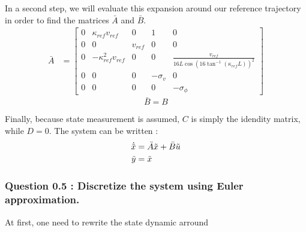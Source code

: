 In a second step, we will evaluate this expansion around our reference trajectory in order to find the matrices $\bar{A}$ and $\bar{B}$.\\
\begin{align}
    \bar{A} &= 
    \left[ {\begin{array}{ccccc}
        0 &\kappa_{ref} v_{ref} &0 &1 &0 \\
        0 &0 &v_{ref} &0 &0\\
        0 &-\kappa_{ref}^2 v_{ref} &0 &0 &\frac{v_{ref}}{16L \cos(16 \tan^{-1}(\kappa_{ref} L))^2}\\
        0 &0 &0 &-\sigma_v &0\\
        0 &0 &0 &0 &-\sigma_{\phi}
    \end{array} } \right]
\end{align}
\begin{equation}
    \bar{B} = B
\end{equation}

Finally, because state measurement is assumed, $C$ is simply the idendity matrix, while $D = 0$. The system can be written : 
\begin{align}
    \dot{\Tilde{x}} &= \Bar{A}\Tilde{x} + \Bar{B}\Tilde{u}\\
    \Tilde{y} &= \Tilde{x}
\end{align}


\subsubsection*{Question 0.5 : Discretize the system using Euler approximation.}
At first, one need to rewrite the state dynamic arround


